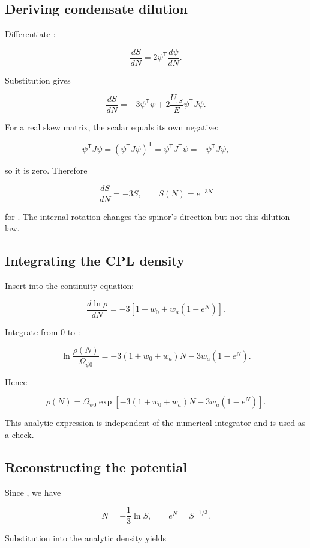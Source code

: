 \documentclass[11pt]{article}
\begin{document}
\subsection{Deriving condensate dilution}

Differentiate \texttt{}:

\[
\frac{dS}{dN}=2\psi^{\mathsf T}\frac{d\psi}{dN}.
\]

Substitution gives

\[
\frac{dS}{dN}=-3\psi^{\mathsf T}\psi
+2\frac{U_{,S}}E\psi^{\mathsf T}J\psi.
\]

For a real skew matrix, the scalar \texttt{} equals its own negative:

\[
\psi^{\mathsf T}J\psi
=(\psi^{\mathsf T}J\psi)^{\mathsf T}
=\psi^{\mathsf T}J^{\mathsf T}\psi
=-\psi^{\mathsf T}J\psi,
\]

so it is zero. Therefore

\[
\frac{dS}{dN}=-3S,
\qquad
S(N)=e^{-3N}
\]

for \texttt{}. The internal rotation changes the spinor's direction but not this dilution law.

\subsection{Integrating the CPL density}

Insert \texttt{} into the continuity equation:

\[
\frac{d\ln\rho}{dN}
=-3[1+w_0+w_a(1-e^N)].
\]

Integrate from 0 to \texttt{}:

\[
\ln\frac{\rho(N)}{\Omega_{\psi0}}
=-3(1+w_0+w_a)N-3w_a(1-e^N).
\]

Hence

\[
\rho(N)=\Omega_{\psi0}
\exp\left[-3(1+w_0+w_a)N-3w_a(1-e^N)\right].
\]

This analytic expression is independent of the numerical integrator and is used as a check.

\subsection{Reconstructing the potential}

Since \texttt{}, we have

\[
N=-\frac13\ln S,
\qquad e^N=S^{-1/3}.
\]

Substitution into the analytic density yields
\end{document}
